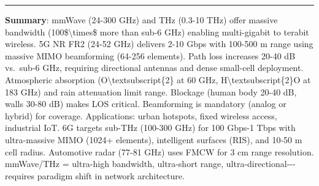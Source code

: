\begin{center}\rule{0.5\linewidth}{0.5pt}\end{center}

\textbf{Summary}: mmWave (24-300 GHz) and THz (0.3-10 THz) offer massive
bandwidth (100\$\textbackslash times\$ more than sub-6 GHz) enabling
multi-gigabit to terabit wireless. 5G NR FR2 (24-52 GHz) delivers 2-10
Gbps with 100-500 m range using massive MIMO beamforming (64-256
elements). Path loss increases 20-40 dB vs.~sub-6 GHz, requiring
directional antennas and dense small-cell deployment. Atmospheric
absorption (O\textbackslash textsubscript\{2\} at 60 GHz,
H\textbackslash textsubscript\{2\}O at 183 GHz) and rain attenuation
limit range. Blockage (human body 20-40 dB, walls 30-80 dB) makes LOS
critical. Beamforming is mandatory (analog or hybrid) for coverage.
Applications: urban hotspots, fixed wireless access, industrial IoT. 6G
targets sub-THz (100-300 GHz) for 100 Gbps-1 Tbps with ultra-massive
MIMO (1024+ elements), intelligent surfaces (RIS), and 10-50 m cell
radius. Automotive radar (77-81 GHz) uses FMCW for 3 cm range
resolution. mmWave/THz = ultra-high bandwidth, ultra-short range,
ultra-directional-\/-\/-requires paradigm shift in network architecture.
